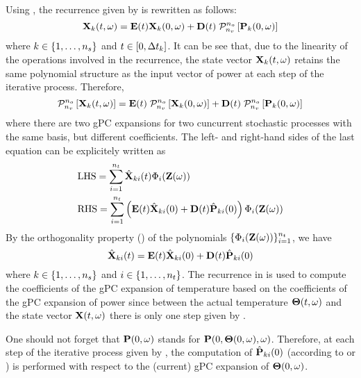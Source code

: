 Using , the recurrence given by  is rewritten as follows:
\[
  \vX_k(\t, \o) = \mE(\t) \vX_k(0, \o) + \mD(\t) \; \oPC{\vars}{\pcorder}{\vP_k(0, \o)}
\]
where $k \in \{ 1, \dotsc, {n_s} \}$ and $t \in [0, \Delta t_k]$. It can be see that, due to the linearity of the operations involved in the recurrence, the state vector $\mathbf{X}_k(t, \omega)$ retains the same polynomial structure as the input vector of power at each step of the iterative process. Therefore,
\[
  \oPC{\vars}{\pcorder}{\vX_k(\t, \o)} = \mE(\t) \; \oPC{\vars}{\pcorder}{\vX_k(0, \o)} + \mD(\t) \; \oPC{\vars}{\pcorder}{\vP_k(0, \o)}
\]
where there are two gPC expansions for two cuncurrent stochastic processes with the same basis, but different coefficients. The left- and right-hand sides of the last equation can be explicitely written as
\begin{align*}
  & \text{LHS} = \sum_{i = 1}^{\pcterms} \pcc{\vX}_{ki}(\t) \pcb_i(\vZ(\o)) \\
  & \text{RHS} = \sum_{i = 1}^{\pcterms} \left( \mE(\t) \pcc{\vX}_{ki}(0) + \mD(\t) \pcc{\vP}_{ki}(0) \right) \pcb_i(\vZ(\o))
\end{align*}
By the orthogonality property () of the polynomials $\{ \Phi_i(\mathbf{Z}(\omega)) \}_{i = 1}^{{n_t}}$, we have
\begin{equation} \elabel{pc-recurrence}
  \pcc{\vX}_{ki}(\t) = \mE(\t) \pcc{\vX}_{ki}(0) + \mD(\t) \pcc{\vP}_{ki}(0)
\end{equation}
where $k \in \{ 1, \dots, {n_s} \}$ and $i \in \{ 1, \dotsc, {n_t} \}$. The recurrence in  is used to compute the coefficients of the gPC expansion of temperature based on the coefficients of the gPC expansion of power since between the actual temperature ${\boldsymbol\Theta}(t, \omega)$ and the state vector $\mathbf{X}(t, \omega)$ there is only one step given by .

One should not forget that $\mathbf{P}(0, \omega)$ stands for $\mathbf{P}(0, {\boldsymbol\Theta}(0, \omega), \omega)$. Therefore, at each step of the iterative process given by , the computation of $\hat{\mathbf{P}}_{ki}(0)$ (according to  or ) is performed with respect to the (current) gPC expansion of ${\boldsymbol\Theta}(0, \omega)$.
